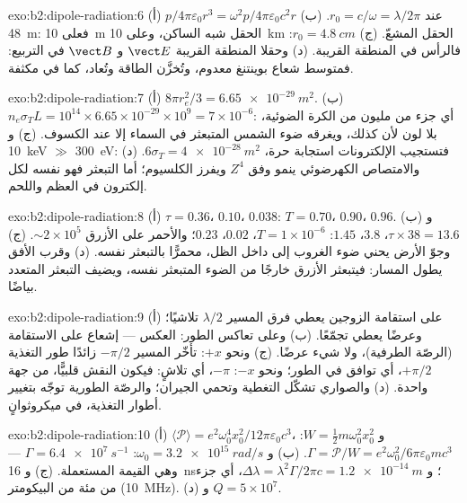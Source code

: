 \begin{solution}{exo:b2:dipole-radiation:6}
(أ) $p/4\pi\varepsilon_0r^3 = \omega^2p/4\pi\varepsilon_0c^2r$ عند $r_0 = c/\omega = \lambda/2\pi$. (ب) \qty{48}{m}:
فعلى \qty{10}{m} الحقل شبه الساكن، وعلى \qty{10}{km} الحقل المشعّ. (ج)
$r_0 = \qty{4.8}{cm}$: فالرأس في المنطقة القريبة. (د) وحقلا المنطقة القريبة $\vect E$
و $\vect B$ في التربيع: فمتوسط شعاع بوينتنغ معدوم،
وتُخزَّن الطاقة وتُعاد، كما في مكثفة.
\end{solution}

\begin{solution}{exo:b2:dipole-radiation:7}
(أ) $8\pi r_e^2/3 = \qty{6.65e-29}{m^2}$. (ب) $n_e\sigma_TL = 10^{14} \times 6.65 \times 10^{-29}
\times 10^9 = 7 \times 10^{-6}$: أي جزء من مليون من الكرة الضوئية، بلا لون لأن
 كذلك، ويغرقه ضوء الشمس المتبعثر في السماء
إلا عند الكسوف. (ج) و \qty{10}{keV} $\gg$ \qty{300}{eV}: فتستجيب الإلكترونات
استجابة حرة، $6\sigma_T = \qty{4e-28}{m^2}$. (د) والامتصاص الكهرضوئي ينمو وفق $Z^4$
ويفرز الكلسيوم؛ أما التبعثر فهو نفسه لكل إلكترون في العظم
واللحم.
\end{solution}

\begin{solution}{exo:b2:dipole-radiation:8}
(أ) $\tau = 0.36$، $0.10$، $0.038$: $T = 0.70$، $0.90$، $0.96$. (ب) و $\tau \times 38 = 13.6$،
$3.8$، $1.45$: $T = 1 \times 10^{-6}$، $0.02$، $0.23$؛ والأحمر على الأزرق $\sim 2 \times 10^5$. (ج)
وجوّ الأرض يحني ضوء الغروب إلى داخل الظل، محمرًّا
بالتبعثر نفسه. (د) وقرب الأفق يطول المسار: فيتبعثر
الأزرق خارجًا من الضوء المتبعثر نفسه، ويضيف التبعثر
المتعدد بياضًا.
\end{solution}

\begin{solution}{exo:b2:dipole-radiation:9}
(أ) على استقامة الزوجين يعطي فرق المسير $\lambda/2$
تلاشيًا؛ وعرضًا يعطي تجمّعًا. (ب) وعلى تعاكس الطور: العكس ---
إشعاع على الاستقامة (الرصّة الطرفية)، ولا شيء عرضًا. (ج) ونحو $+x$:
تأخّر المسير $-\pi/2$ زائدًا طور التغذية $+\pi/2$، أي توافق في الطور؛ ونحو $-x$:
$-\pi$، أي تلاشٍ: فيكون النقش قلبيًّا، من جهة واحدة. (د) والصواري تشكّل التغطية
وتحمي الجيران؛ والرصّة الطورية توجّه بتغيير أطوار
التغذية، في ميكروثوانٍ.
\end{solution}

\begin{solution}{exo:b2:dipole-radiation:10}
(أ) $\langle\mathcal P\rangle = e^2\omega_0^4x_0^2/12\pi\varepsilon_0c^3$، و $W = \tfrac12m\omega_0^2x_0^2$:
$\Gamma = \mathcal P/W = e^2\omega_0^2/6\pi\varepsilon_0mc^3$. (ب) و $\omega_0 = \qty{3.2e15}{rad/s}$: $\Gamma =
\qty{6.4e7}{s^{-1}}$ --- وهي القيمة المستعملة. (ج) و \qty{16}{ns}؛ و $\Delta\lambda = \lambda^2\Gamma/2\pi c =
\qty{1.2e-14}{m}$، أي جزء من مئة من البيكومتر (\qty{10}{MHz}). (د) و $Q = 5 \times 10^7$.
\end{solution}

